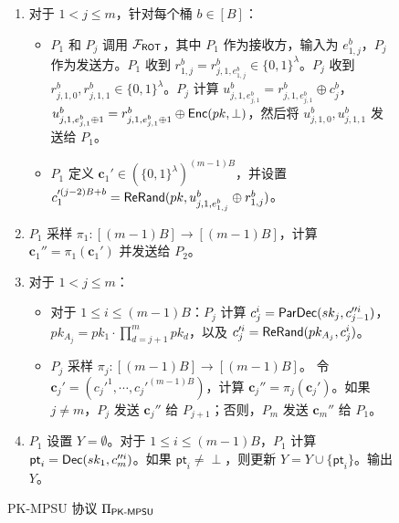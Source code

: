\begin{figure}[!htbp]
\begin{framed}
\begin{minipage}[c]{\textwidth}
\begin{trivlist}
\begin{enumerate} [itemsep=2pt,topsep=0pt,parsep=0pt]
\begin{itemize} [itemsep=2pt,topsep=0pt,parsep=0pt,leftmargin=10pt]
\begin{itemize} [itemsep=2pt,topsep=0pt,parsep=0pt,leftmargin=10pt]
    \item[-] $P_i$ 定义 $v_{j,i}^b = u_{j,i,e_{i,j}^b}^b \oplus r_{i,j}^b$ 并将 ${v}_{j,i}'^b = \ReRand(pk,v_{j,i}^b)$ 发送给 $P_j$。$P_j$ 更新 $c_j^b = \ReRand(pk,{v}_{j,i}'^b)$。
    \end{itemize}
    \end{itemize}
\item 对于 $1 < j \le m$，针对每个桶 $b \in [B]$：
\begin{itemize} [itemsep=2pt,topsep=0pt,parsep=0pt,leftmargin=10pt]
\item[-] $P_1$ 和 $P_j$ 调用 $\mathcal{F}_\mathsf{ROT}$，其中 $P_1$ 作为接收方，输入为 $e_{1,j}^b$，$P_j$ 作为发送方。$P_1$ 收到 $r_{1,j}^b = r_{j,1,e_{1,j}^b}^b \in \{0,1\}^ \lambda$。$P_j$ 收到 $r_{j,1,0}^b, r_{j,1,1}^b \in \{0,1\}^ \lambda$。$P_j$ 计算 $u_{j,1,e_{j,1}^b}^b = r_{j,1,e_{j,1}^b}^b \oplus c_j^b$，$u_{j,1,e_{j,1}^b \oplus 1}^b = r_{j,1,e_{j,1}^b \oplus 1}^b \oplus \mathsf{Enc}(pk, \perp)$，然后将 $u_{j,1,0}^b, u_{j,1,1}^b$ 发送给 $P_1$。 
\item[-] $P_1$ 定义 $\textbf{c}_1' \in (\{0,1\}^{\lambda})^{(m-1)B}$，并设置 ${c}_1'^{(j-2)B+b} = \mathsf{ReRand}(pk,u_{j,1,e_{1,j}^b}^b \oplus r_{1,j}^b)$。
\end{itemize}
\item $P_1$ 采样 $\pi_1:[(m-1)B] \to [(m-1)B]$，计算 $\textbf{c}_1'' = \pi_1(\textbf{c}_1')$ 并发送给 $P_{2}$。
\item 对于 $1 < j \le m$： 
    \begin{itemize} [itemsep=2pt,topsep=0pt,parsep=0pt,leftmargin=10pt]
    \item[-] 对于 $1 \le i \le (m-1)B$：$P_j$ 计算 ${c}_{j}^i = \mathsf{ParDec}(sk_j,{c}_{j-1}''^i)$，$pk_{A_j} = pk_1 \cdot \prod_{d = j+1}^m pk_d$，以及 ${c}_{j}'^i = \mathsf{ReRand}(pk_{A_j},{c}_{j}^i)$。 
    \item[-] $P_j$ 采样 $\pi_j:[(m-1)B] \to [(m-1)B]$。 令 $\textbf{c}_j' = ({c}_{j}'^1,\cdots,{c}_{j}'^{(m-1)B})$，计算 $\textbf{c}_{j}'' = {\pi_j}(\textbf{c}_{j}')$。如果 $j \ne m$，$P_j$ 发送 $\textbf{c}_{j}''$ 给 $P_{j+1}$；否则，$P_m$ 发送 $\textbf{c}_{m}''$ 给 $P_{1}$。
    \end{itemize}
\item $P_{1}$ 设置 $Y = \emptyset$。对于 $1 \le i \le (m-1)B$，$P_1$ 计算 $\mathsf{pt}_i = \mathsf{Dec}(sk_1,{c}_{m}''^i)$。如果 $\mathsf{pt}_i \ne \perp$，则更新 $Y = Y \cup \{\mathsf{pt}_i\}$。输出 $Y$。
\end{enumerate}
\end{trivlist}
\end{minipage}
\end{framed}
\caption{PK-MPSU 协议 $\Pi_\mathsf{PK\text{-}MPSU}$}\label{fig:proto-mpsu4}
\end{figure}

